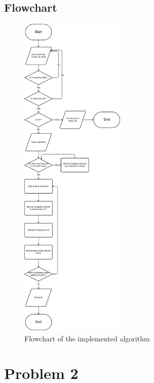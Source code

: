 \documentclass[a4paper]{article}
\theoremstyle{plain}
\theoremstyle{definition}
\theoremstyle{remark}
\begin{document}
\subsection{Flowchart}
\begin{figure}[H]
	\centering
	\includegraphics[width=0.45\textwidth]{figures/cs.png}
	\caption{Flowchart of the implemented algorithm}
	\label{fig:algorithm}
\end{figure}
\newpage
\section{Problem 2}
\end{document}

